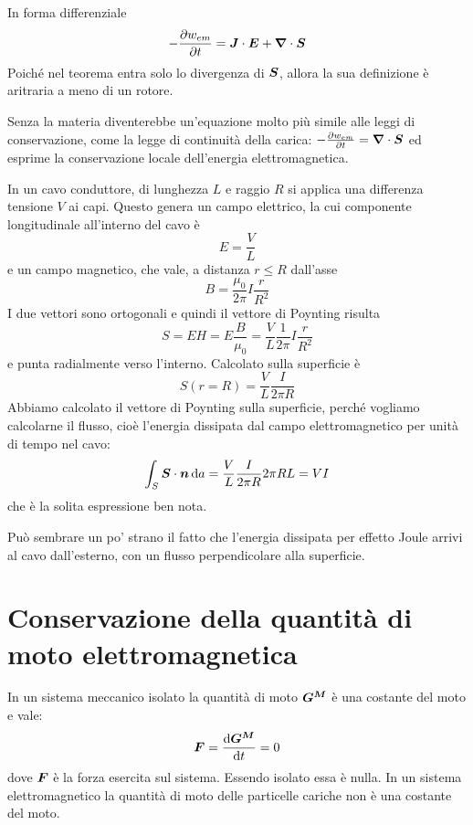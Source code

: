 In forma differenziale
\begin{equation}
  -\frac{\partial w_{em}}{\partial t}=\boldsymbol{J}\cdot \boldsymbol{E} + \boldsymbol{\nabla} \cdot \boldsymbol{S}
\end{equation}
Poiché nel teorema entra solo lo divergenza di $\boldsymbol{S}$, allora la sua definizione è aritraria a meno di un rotore.

Senza la materia diventerebbe un'equazione molto più simile alle leggi di conservazione, come la legge di continuità della carica: \(  -\frac{\partial w_{em}}{\partial t} = \boldsymbol{\nabla} \cdot \boldsymbol{S}\) ed esprime la conservazione locale dell'energia elettromagnetica.

\begin{Es}
  In un cavo conduttore, di lunghezza $L$ e raggio $R$ si applica una differenza tensione $V$ ai capi. Questo genera un campo elettrico, la cui componente longitudinale all'interno del cavo è
  \[
    E = \frac{V}{L}
  \]
  e un campo magnetico, che vale, a distanza $r\leq R$ dall'asse
  \[
    B = \frac{\mu_0}{2\pi}I\frac{r}{R^2}
  \]
  I due vettori sono ortogonali e quindi il vettore di Poynting risulta
  \[
    S = EH = E \frac{B}{\mu_0} = \frac{V}{L}\frac{1}{2\pi}I\frac{r}{R^2}
  \]
  e punta radialmente verso l'interno. Calcolato sulla superficie è
  \[
    S(r=R) = \frac{V}{L} \frac{I}{2\pi R}
  \]
  Abbiamo calcolato il vettore di Poynting sulla superficie, perché vogliamo calcolarne il flusso, cioè l'energia dissipata dal campo elettromagnetico per unità di tempo nel cavo:
  \[
    \int_S \boldsymbol{S} \cdot \boldsymbol{n}\,\mathrm{d} a = \frac{V}{L} \frac{I}{2\pi R} 2\pi R L = V I
  \]
  che è la solita espressione ben nota.

  Può sembrare un po' strano il fatto che l'energia dissipata per effetto Joule arrivi al cavo dall'esterno, con un flusso perpendicolare alla superficie.
\end{Es}


\section{Conservazione della quantità di moto elettromagnetica}
In un sistema meccanico isolato la quantità di moto $\boldsymbol{G^M}$ è una costante del moto e vale:
\begin{equation}
  \boldsymbol{F}=\frac{\mathrm{d} \boldsymbol{G^M}}{\mathrm{d} t}=0
\end{equation}
dove $\boldsymbol{F}$ è la forza esercita sul sistema. Essendo isolato essa è nulla. In un sistema elettromagnetico la quantità di moto delle particelle cariche non è una costante del moto.

